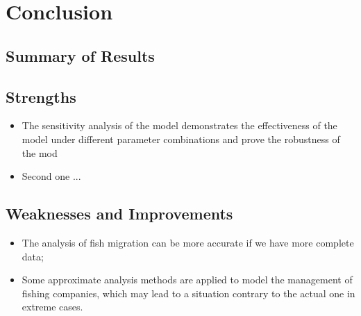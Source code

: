 \documentclass[12pt]{ctexart}
\begin{document}
\section{Conclusion}
\subsection{Summary of Results}

\subsection{Strengths}%
\begin{itemize}
	\item The sensitivity analysis of the model demonstrates the effectiveness of the model under different parameter combinations and prove the robustness of the mod
	\item Second one ...
\end{itemize}

\subsection{Weaknesses and Improvements}%
\begin{itemize}
	\item The analysis of fish migration can be more accurate if we have more complete data;
	\item Some approximate analysis methods are applied to model the management of fishing
	      companies, which may lead to a situation contrary to the actual one  in extreme cases.
\end{itemize}
















\newpage
\thispagestyle{empty}
\vspace{-6cm}
\end{document}
